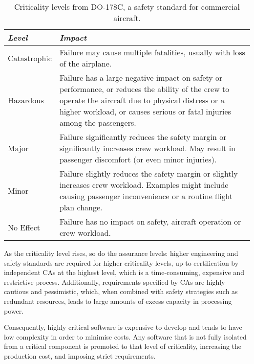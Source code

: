 \begin{table}
     \centering
     \begin{tabular}{ l p{10cm}} \toprule
         \emph{Level}   & \emph{Impact} \\ \midrule
         Catastrophic   & Failure may cause multiple fatalities, usually with loss of the airplane. \\
         Hazardous      & Failure has a large negative impact on safety or performance, or reduces the
                          ability of the crew to operate the aircraft due to physical distress or 
                          a higher workload, or causes serious or fatal injuries among the passengers.\\
         Major          & Failure significantly reduces the safety margin or significantly increases
                          crew workload. May result in passenger discomfort (or even minor
                          injuries).\\
         Minor          & Failure slightly reduces the safety margin or slightly increases crew
                          workload. Examples might include causing passenger inconvenience or a
                          routine flight plan change. \\
         No Effect      & Failure has no impact on safety, aircraft operation or crew workload. \\
         \bottomrule
     \end{tabular}
     \caption[Criticality levels from DO-178C]{Criticality levels from DO-178C, a safety standard for commercial aircraft.}
     \label{tab:criticality_table}
 \end{table}

As the criticality level rises, so do the assurance levels: higher engineering and safety standards are required for higher criticality levels, up to
certification by independent \glspl{CA} at the highest level, which is a time-consuming,
expensive and restrictive process. Additionally, requirements specified by \glspl{CA} are highly
cautious and pessimistic, which, when combined with safety strategies such as redundant resources,
leads to large amounts of excess capacity in processing power. 

Consequently, highly
critical software is expensive to develop and tends to have low complexity in order to
minimise costs. Any software that is not fully isolated from a critical component is promoted to
that level of criticality, increasing the production cost, and imposing strict requirements.

